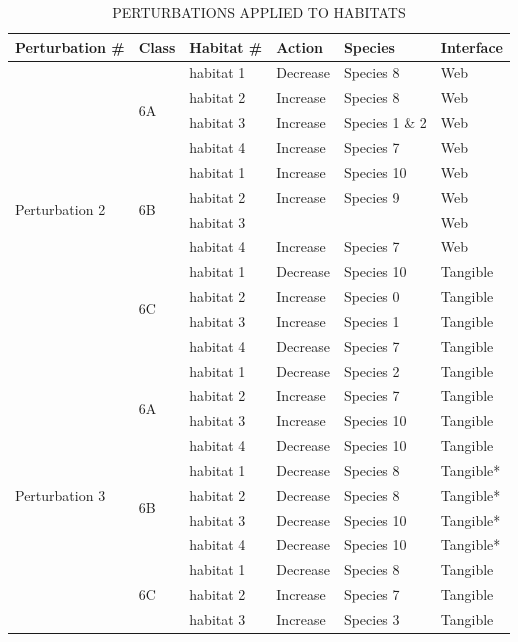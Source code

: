 \begin{table}
\centering
\caption{PERTURBATIONS APPLIED TO HABITATS}
\begin{tabular}{ | l | l | l | l | l | l | }
\hline
Perturbation \# & Class  & Habitat \# & Action & Species & Interface \\
\hline
\hline
\multirow{12}{*}{Perturbation 2} & \multirow{4}{*}{6A} & habitat 1 & Decrease  & Species 8 & Web \\
 & & habitat 2 & Increase & Species 8 & Web \\
 & & habitat 3 & Increase & Species 1 \& 2 & Web \\
 & & habitat 4 & Increase & Species 7 & Web \\
\cline{2-6}
 & \multirow{4}{*}{6B} & habitat 1 & Increase & Species 10 & Web \\
 & & habitat 2 & Increase & Species 9 & Web \\
 & & habitat 3 & & & Web \\
 & & habitat 4 & Increase & Species 7 & Web \\
\cline{2-6}
 & \multirow{4}{*}{6C} & habitat 1 & Decrease & Species 10 & Tangible \\
 & & habitat 2 & Increase & Species 0 & Tangible \\
 & & habitat 3 & Increase & Species 1 & Tangible \\
 & & habitat 4 & Decrease & Species 7 & Tangible \\ 
\hline
\multirow{12}{*}{Perturbation 3} & \multirow{4}{*}{6A} & habitat 1 & Decrease & Species 2 & Tangible \\
 & & habitat 2 & Increase & Species 7  & Tangible \\
 & & habitat 3 & Increase & Species 10 & Tangible \\
 & & habitat 4 & Decrease & Species 10 & Tangible \\
\cline{2-6}
 & \multirow{4}{*}{6B} & habitat 1 & Decrease & Species 8 & Tangible* \\
 & & habitat 2 & Decrease & Species 8  & Tangible* \\
 & & habitat 3 & Decrease & Species 10 & Tangible* \\
 & & habitat 4 & Decrease & Species 10 & Tangible* \\
\cline{2-6}
 & \multirow{4}{*}{6C} & habitat 1 & Decrease & Species 8 & Tangible \\
 & & habitat 2 & Increase & Species 7 & Tangible \\
 & & habitat 3 & Increase & Species 3 & Tangible \\

\end{tabular}
\end{table}
